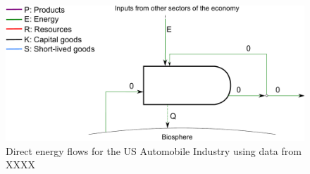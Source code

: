 \begin{figure}[h!]
\centering
\includegraphics[width=0.8\linewidth]{Part_2/Chapter_Energy/images/PERKS_basic_unit_energy_auto_ind.pdf}
\caption{Direct energy flows for the US Automobile Industry using data from XXXX}
\label{fig:PERKS_energy_auto}
\end{figure}








%
%


